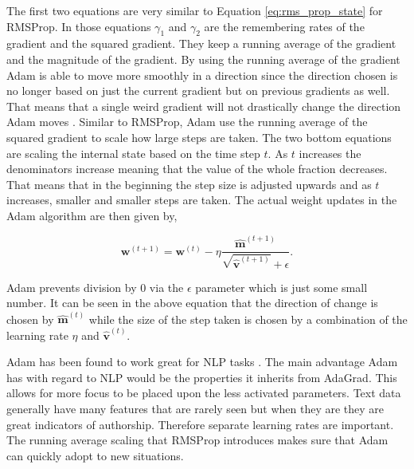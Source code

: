 \begin{description}
        The first two equations are very similar to Equation
        \eqref{eq:rms_prop_state} for \gls{RMSProp}. In those equations
        $\gamma_1$ and $\gamma_2$ are the remembering rates of the gradient
        and the squared gradient. They keep a running average of the gradient
        and the magnitude of the gradient. By using the running average of
        the gradient \gls{Adam} is able to move more smoothly in a direction
        since the direction chosen is no longer based on just the current
        gradient but on previous gradients as well. That means that a single
        weird gradient will not drastically change the direction \gls{Adam}
        moves \citep{DBLP:journals/corr/KingmaB14}. Similar to \gls{RMSProp},
        \gls{Adam} use the running average of the squared gradient to scale how
        large steps are taken. The two bottom equations are scaling the internal
        state based on the time step $t$. As $t$ increases the denominators
        increase meaning that the value of the whole fraction decreases. That
        means that in the beginning the step size is adjusted upwards and as
        $t$ increases, smaller and smaller steps are taken. The actual weight
        updates in the \gls{Adam} algorithm are then given by,

        \begin{equation}
            \mathbf{w}^{(t + 1)} = \mathbf{w}^{(t)} -
                \eta\frac
                    {\mathbf{\hat{m}}^{(t+1)}}
                    {\sqrt{\mathbf{\hat{v}}^{(t+1)}} + \epsilon}.
        \end{equation}

        \gls{Adam} prevents division by 0 via the $\epsilon$ parameter which is
        just some small number. It can be seen in the above equation that the
        direction of change is chosen by $\mathbf{\hat{m}}^{(t)}$ while the size
        of the step taken is chosen by a combination of the learning rate $\eta$
        and $\mathbf{\hat{v}}^{(t)}$.

        \gls{Adam} has been found to work great for \gls{NLP} tasks
        \cite{Pompey2016TheAO}. The main advantage \gls{Adam} has with regard
        to \gls{NLP} would be the properties it inherits from \gls{AdaGrad}.
        This allows for more focus to be placed upon the less activated
        parameters. Text data generally have many features that are rarely seen
        but when they are they are great indicators of authorship. Therefore
        separate learning rates are important. The running average scaling that
        \gls{RMSProp} introduces makes sure that \gls{Adam} can quickly adopt to
        new situations.

\end{description}


